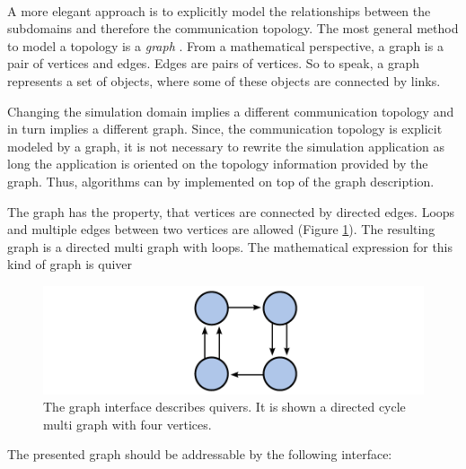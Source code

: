 \paragraph*{}
A more elegant approach is to explicitly model the relationships
between the subdomains and therefore the communication topology. The
most general method to model a topology is a \textit{graph}
\cite{ref:graph}.  From a mathematical perspective, a graph is a pair
of vertices and edges. Edges are pairs of vertices. So to speak, a
graph represents a set of objects, where some of these objects are
connected by links.

Changing the simulation domain implies a different communication
topology and in turn implies a different graph.  Since, the
communication topology is explicit modeled by a graph, it is not
necessary to rewrite the simulation application as long the
application is oriented on the topology information provided by the
graph. Thus, algorithms can by implemented on top of the graph
description.

The graph has the property, that vertices are connected by directed edges. Loops
and multiple edges between two vertices are allowed (Figure
\ref{fig:graph}). The resulting graph is a directed multi graph with
loops. The mathematical expression for this kind of graph is quiver
\cite{ref:quiver}

\begin{figure}[H]
  \centering \includegraphics[width=\textwidth]{graphics/30_graph}
  \caption{The graph interface describes quivers. It is shown a directed cycle multi graph with four vertices.}
  \label{fig:graph}
\end{figure}

The presented graph should be addressable by the following interface:

